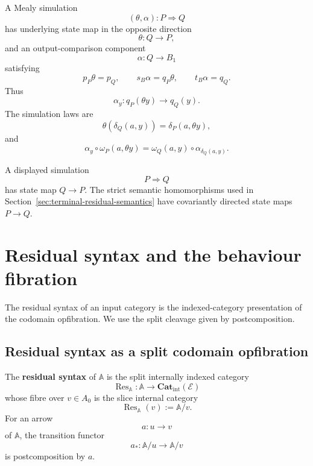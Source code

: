 \begin{notation}
\label{not:simulation-recall-behaviour}
    A Mealy simulation
    \[
        (\theta,\alpha):P\Rightarrow Q
    \]
    has underlying state map in the opposite direction
    \[
        \theta:Q\to P,
    \]
    and an output-comparison component
    \[
        \alpha:Q\to B_1
    \]
    satisfying
    \[
        p_P\theta=p_Q,
        \qquad
        s_B\alpha=q_P\theta,
        \qquad
        t_B\alpha=q_Q.
    \]
    Thus
    \[
        \alpha_y:q_P(\theta y)\to q_Q(y).
    \]
    The simulation laws are
    \[
        \theta(\delta_Q(a,y))
        =
        \delta_P(a,\theta y),
    \]
    and
    \[
        \alpha_y\circ\omega_P(a,\theta y)
        =
        \omega_Q(a,y)\circ\alpha_{\delta_Q(a,y)}.
    \]
\end{notation}

\begin{remark}
\label{rem:simulation-direction-warning-behaviour}
    A displayed simulation
    \[
        P\Rightarrow Q
    \]
    has state map \(Q\to P\). The strict semantic homomorphisms used in Section~\ref{sec:terminal-residual-semantics} have covariantly directed state maps \(P\to Q\).
\end{remark}

\section{Residual syntax and the behaviour fibration}
\label{sec:residual-syntax-behaviour-fibration}

The residual syntax of an input category is the indexed-category presentation of the codomain opfibration. We use the split cleavage given by postcomposition.

\subsection{Residual syntax as a split codomain opfibration}
\label{subsec:residual-opfibration}

\begin{definition}
\label{def:residual-syntax}
    The \textbf{residual syntax} of \(\mathbb A\) is the split internally indexed category
    \[
        \operatorname{Res}_{\mathbb A}:\mathbb A\to
        \mathbf{Cat}_{\mathrm{int}}(\mathcal E)
    \]
    whose fibre over \(v\in A_0\) is the slice internal category
    \[
        \operatorname{Res}_{\mathbb A}(v):=\mathbb A/v.
    \]
    For an arrow
    \[
        a:u\to v
    \]
    of \(\mathbb A\), the transition functor
    \[
        a_*:\mathbb A/u\to\mathbb A/v
    \]
    is postcomposition by \(a\).
\end{definition}


